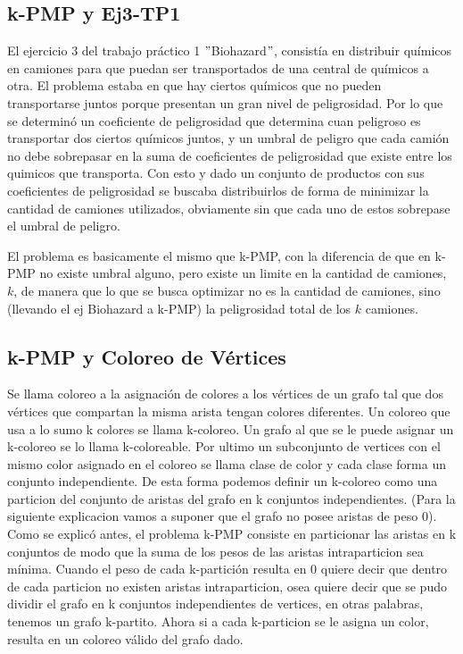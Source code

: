 \subsection{k-PMP y Ej3-TP1}

El ejercicio 3 del trabajo práctico 1 $"$Biohazard$"$, consistía en distribuir químicos en camiones para que puedan ser transportados de una central de químicos a otra. El problema estaba en que hay ciertos químicos que no pueden transportarse juntos porque presentan un gran nivel de peligrosidad. Por lo que se determinó un coeficiente de peligrosidad que determina cuan peligroso es transportar dos ciertos químicos juntos, y un umbral de peligro que cada camión no debe sobrepasar en la suma de coeficientes de peligrosidad que existe entre los quimicos que transporta.
Con esto y dado un conjunto de productos con sus coeficientes de peligrosidad se buscaba distribuirlos de forma de minimizar la cantidad de camiones utilizados, obviamente sin que cada uno de estos sobrepase el umbral de peligro.

El problema es basicamente el mismo que k-PMP, con la diferencia de que en k-PMP no existe umbral alguno, pero existe un limite en la cantidad de camiones, $k$, de manera que lo que se busca optimizar no es la cantidad de camiones, sino (llevando el ej Biohazard a k-PMP) la peligrosidad total de los $k$ camiones.


\subsection{k-PMP y Coloreo de Vértices}

Se llama coloreo a la asignación de colores a los vértices de un grafo tal que dos vértices que compartan la misma arista tengan colores diferentes. 
Un coloreo que usa a lo sumo k colores se llama k-coloreo. Un grafo al que se le puede asignar un k-coloreo se lo llama k-coloreable. Por ultimo un subconjunto de vertices con el mismo color asignado en el coloreo se llama clase de color y cada clase forma un conjunto independiente. De esta forma podemos definir un k-coloreo como una particion del conjunto de aristas del grafo en k conjuntos independientes.
(Para la siguiente explicacion vamos a suponer que el grafo no posee aristas de peso 0).
Como se explicó antes, el problema k-PMP consiste en particionar las aristas en k conjuntos de modo que la suma de los pesos de las aristas intraparticion sea mínima.
Cuando el peso de cada k-partición resulta en 0 quiere decir que dentro de cada particion no existen aristas intraparticion, osea quiere decir que se pudo dividir el grafo en k conjuntos independientes de vertices, en otras palabras, tenemos un grafo k-partito. Ahora si a cada k-particion se le asigna un color, resulta en un coloreo válido del grafo dado. 


